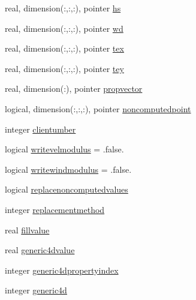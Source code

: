 \begin{DoxyCompactItemize}
\item 
real, dimension(\+:,\+:,\+:), pointer \mbox{\hyperlink{structmodulereadswannonstationary_1_1t__swan_a7e4a3fc9198d2369e787345a5c01582c}{hs}}
\item 
real, dimension(\+:,\+:,\+:), pointer \mbox{\hyperlink{structmodulereadswannonstationary_1_1t__swan_addd342f6b578c0a05b638b2469a98548}{wd}}
\item 
real, dimension(\+:,\+:,\+:), pointer \mbox{\hyperlink{structmodulereadswannonstationary_1_1t__swan_ab137aee59a25110de6a302eecaaf17c0}{tex}}
\item 
real, dimension(\+:,\+:,\+:), pointer \mbox{\hyperlink{structmodulereadswannonstationary_1_1t__swan_a252243686fd31b37de5182a535ebb865}{tey}}
\item 
real, dimension(\+:), pointer \mbox{\hyperlink{structmodulereadswannonstationary_1_1t__swan_af3103ab38a55c4d6917c3db93e22bb86}{propvector}}
\item 
logical, dimension(\+:,\+:,\+:), pointer \mbox{\hyperlink{structmodulereadswannonstationary_1_1t__swan_a55742ed879f7465496112f8587b54742}{noncomputedpoint}}
\item 
integer \mbox{\hyperlink{structmodulereadswannonstationary_1_1t__swan_a7a4c4de9e9b22a59af5fe07b105281ed}{clientumber}}
\item 
logical \mbox{\hyperlink{structmodulereadswannonstationary_1_1t__swan_af3bbf64ec84e801fac073c72e09cbba9}{writevelmodulus}} = .false.
\item 
logical \mbox{\hyperlink{structmodulereadswannonstationary_1_1t__swan_ac20c2b451cc19be4738876448cf1137a}{writewindmodulus}} = .false.
\item 
logical \mbox{\hyperlink{structmodulereadswannonstationary_1_1t__swan_aedb090e2d98d7a0c22d658d86f280220}{replacenoncomputedvalues}}
\item 
integer \mbox{\hyperlink{structmodulereadswannonstationary_1_1t__swan_a17ed67f84105ae4399a072601e0848fc}{replacementmethod}}
\item 
real \mbox{\hyperlink{structmodulereadswannonstationary_1_1t__swan_a0444df9446fc24c0b6ff1e9fef35bdeb}{fillvalue}}
\item 
real \mbox{\hyperlink{structmodulereadswannonstationary_1_1t__swan_ac4fbbb5d7b4330651c4daeed96398515}{generic4dvalue}}
\item 
integer \mbox{\hyperlink{structmodulereadswannonstationary_1_1t__swan_ac8f97a504718e2bf902b94ed59ae4cad}{generic4dpropertyindex}}
\item 
integer \mbox{\hyperlink{structmodulereadswannonstationary_1_1t__swan_a2993ddceac0e3f0a1929cfb76cc4a083}{generic4d}}

\end{DoxyCompactItemize}
